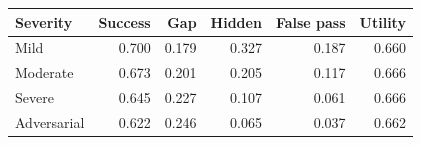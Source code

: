 \begin{tabular}{lrrrrr}
\toprule
Severity & Success & Gap & Hidden & False pass & Utility \\
\midrule
Mild & 0.700 & 0.179 & 0.327 & 0.187 & 0.660 \\
Moderate & 0.673 & 0.201 & 0.205 & 0.117 & 0.666 \\
Severe & 0.645 & 0.227 & 0.107 & 0.061 & 0.666 \\
Adversarial & 0.622 & 0.246 & 0.065 & 0.037 & 0.662 \\
\bottomrule
\end{tabular}
